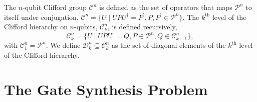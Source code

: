 \documentclass{article}
\theoremstyle{definition}
\theoremstyle{problem}
\theoremstyle{lemma}
\begin{document}
		The $n$-qubit Clifford group $\mathcal{C}^n$ is defined as the set of operators that maps $\mathcal{P}^n$ to itself under conjugation, $\mathcal{C}^n = \{U \mid UPU^\dagger = P^\prime, P, P^\prime \in \mathcal{P}^n\}$. The $k^{\text{th}}$ level of the Clifford hierarchy on $n$-qubits, $\mathcal{C}_k^n$, is defined recursively,
		\begin{equation}
		\mathcal{C}_k^n = \{U \mid UPU^\dagger = Q, P \in \mathcal{P}^n, Q \in \mathcal{C}_{k-1}^n\},
		\end{equation}
		with $\mathcal{C}_1^n = \mathcal{P}^n$. We define $\mathcal{D}_k^n \subseteq \mathcal{C}_k^n$ as the set of diagonal elements of the $k^{\text{th}}$ level of the Clifford hierarchy.
		
		
		
	
	\FloatBarrier
	\section{The Gate Synthesis Problem}
	\label{s3_Problem}
	
\end{document}
